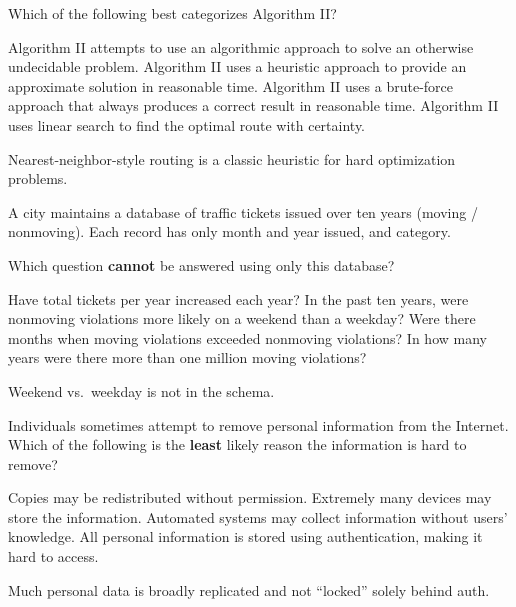 Which of the following best categorizes Algorithm II?
\begin{choices}
  \choice Algorithm II attempts to use an algorithmic approach to solve an otherwise undecidable problem.
  \CorrectChoice Algorithm II uses a heuristic approach to provide an approximate solution in reasonable time.
  \choice Algorithm II uses a brute-force approach that always produces a correct result in reasonable time.
  \choice Algorithm II uses linear search to find the optimal route with certainty.
\end{choices}
\begin{solution}
  Nearest-neighbor-style routing is a classic heuristic for hard optimization problems.
\end{solution}






\newpage




\question[5]
A city maintains a database of traffic tickets issued over ten years (moving / nonmoving). Each record has only month and year issued, and category.

Which question \textbf{cannot} be answered using only this database?
\begin{choices}
  \choice Have total tickets per year increased each year?
  \CorrectChoice In the past ten years, were nonmoving violations more likely on a weekend than a weekday?
  \choice Were there months when moving violations exceeded nonmoving violations?
  \choice In how many years were there more than one million moving violations?
\end{choices}
\begin{solution}
  Weekend vs.\ weekday is not in the schema.
\end{solution}


\question[5]
Individuals sometimes attempt to remove personal information from the Internet. Which of the following is the \textbf{least} likely reason the information is hard to remove?
\begin{choices}
  \choice Copies may be redistributed without permission.
  \choice Extremely many devices may store the information.
  \choice Automated systems may collect information without users' knowledge.
  \CorrectChoice All personal information is stored using authentication, making it hard to access.
\end{choices}
\begin{solution}
  Much personal data is broadly replicated and not ``locked'' solely behind auth.
\end{solution}

